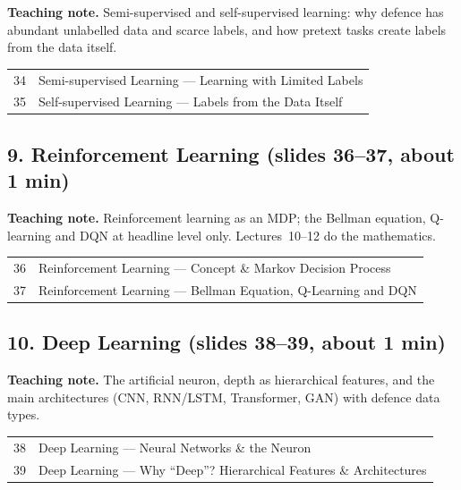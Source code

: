 \documentclass[11pt]{article}
\begin{document}
\textbf{Teaching note.} Semi-supervised and self-supervised learning: why defence has abundant unlabelled data and scarce labels, and how pretext tasks create labels from the data itself.

\begin{center}\small\renewcommand{\arraystretch}{1.1}\begin{tabularx}{\textwidth}{@{}r X@{}}34 & Semi-supervised Learning --- Learning with Limited Labels\\
35 & Self-supervised Learning --- Labels from the Data Itself\\\end{tabularx}\end{center}

\subsection{9. Reinforcement Learning \normalfont\small\color{GreyN}(slides 36--37, about 1 min)}

\textbf{Teaching note.} Reinforcement learning as an MDP; the Bellman equation, Q-learning and DQN at headline level only. Lectures~10--12 do the mathematics.

\begin{center}\small\renewcommand{\arraystretch}{1.1}\begin{tabularx}{\textwidth}{@{}r X@{}}36 & Reinforcement Learning --- Concept \& Markov Decision Process\\
37 & Reinforcement Learning --- Bellman Equation, Q-Learning and DQN\\\end{tabularx}\end{center}

\subsection{10. Deep Learning \normalfont\small\color{GreyN}(slides 38--39, about 1 min)}

\textbf{Teaching note.} The artificial neuron, depth as hierarchical features, and the main architectures (CNN, RNN/LSTM, Transformer, GAN) with defence data types.

\begin{center}\small\renewcommand{\arraystretch}{1.1}\begin{tabularx}{\textwidth}{@{}r X@{}}38 & Deep Learning --- Neural Networks \& the Neuron\\
39 & Deep Learning --- Why ``Deep''? Hierarchical Features \& Architectures\\\end{tabularx}\end{center}
\end{document}
